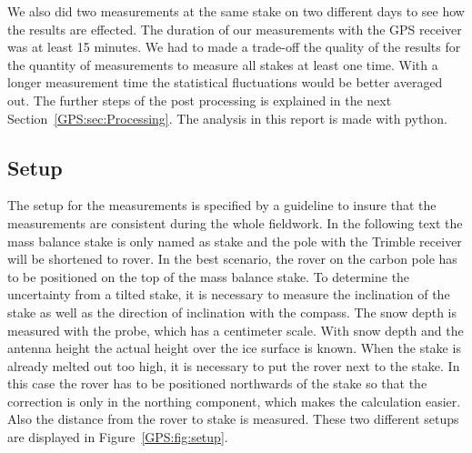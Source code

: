We also did two measurements at the same stake on two different days to see how the results are effected.
The duration of our measurements with the GPS receiver was at least 15 minutes. 
We had to made a trade-off the quality of the results for the quantity of
measurements to measure all stakes at least one time. 
With a longer measurement time the statistical fluctuations would be better averaged out.
The further steps of the post processing is explained in the next Section~\ref{GPS:sec:Processing}.\newline
The analysis in this report is made with python.

\subsection{Setup} \label{GPS:subsec:setup}

The setup for the measurements is specified by a guideline to insure that the measurements are consistent during the whole fieldwork.
In the following text the mass balance stake is only named as stake and the pole with the Trimble receiver will be shortened to rover.
In the best scenario, the rover on the carbon pole has to be positioned on the top of the mass balance stake.
To determine the uncertainty from a tilted stake, it is necessary to measure the inclination of the stake as well as the direction of inclination with the compass.
The snow depth is measured with the probe, which has a centimeter scale.
With snow depth and the antenna height the actual height over the ice surface is known. 
When the stake is already melted out too high, it is necessary to put the rover next to the stake. 
In this case the rover has to be positioned northwards of the stake so that the correction is only in the northing component, which makes the calculation easier. 
Also the distance from the rover to stake is measured.
These two different setups are displayed in Figure~\ref{GPS:fig:setup}.

